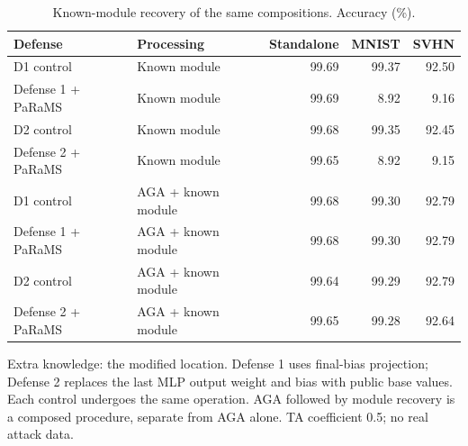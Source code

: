 \begin{table}[t]
\centering\small
\setlength{\tabcolsep}{4pt}
\caption{Known-module recovery of the same compositions. Accuracy (\%).}
\label{tab:params_composition_recovery}
\begin{tabular}{@{}llrrr@{}}
\toprule
Defense & Processing & Standalone & MNIST & SVHN \\
\midrule
D1 control & Known module & 99.69 & 99.37 & 92.50 \\
\midrule
Defense 1 + PaRaMS & Known module & 99.69 & 8.92 & 9.16 \\
\midrule
D2 control & Known module & 99.68 & 99.35 & 92.45 \\
\midrule
Defense 2 + PaRaMS & Known module & 99.65 & 8.92 & 9.15 \\
\midrule
D1 control & AGA + known module & 99.68 & 99.30 & 92.79 \\
\midrule
Defense 1 + PaRaMS & AGA + known module & 99.68 & 99.30 & 92.79 \\
\midrule
D2 control & AGA + known module & 99.64 & 99.29 & 92.79 \\
\midrule
Defense 2 + PaRaMS & AGA + known module & 99.65 & 99.28 & 92.64 \\
\bottomrule
\end{tabular}
\par\smallskip
\begin{minipage}{\textwidth}\footnotesize Extra knowledge: the modified location. Defense 1 uses final-bias projection; Defense 2 replaces the last MLP output weight and bias with public base values. Each control undergoes the same operation. AGA followed by module recovery is a composed procedure, separate from AGA alone. TA coefficient 0.5; no real attack data.\end{minipage}
\end{table}
